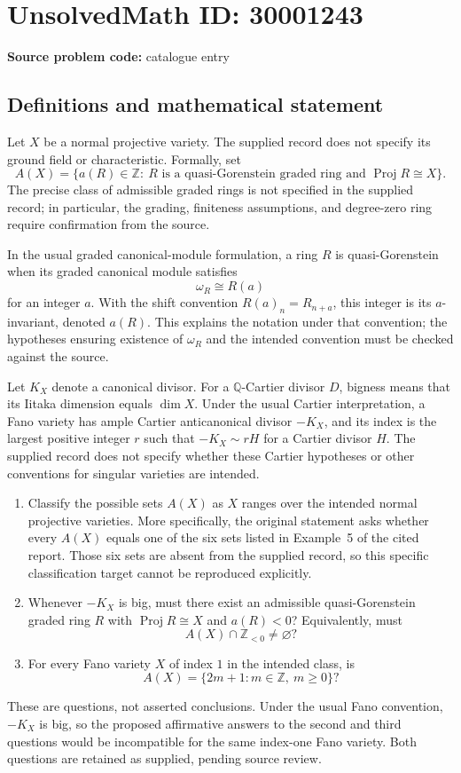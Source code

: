 \documentclass[11pt]{article}
\newcommand{\Z}{\mathbb{Z}}
\newcommand{\Q}{\mathbb{Q}}
\begin{document}
\section*{UnsolvedMath ID: 30001243}
\textbf{Source problem code:} catalogue entry
\subsection{Definitions and mathematical statement}
Let \(X\) be a normal projective variety. The supplied record does not specify its ground field or characteristic. Formally, set
\[
A(X)=\bigl\{a(R)\in\Z:\ R\text{ is a quasi-Gorenstein graded ring and }\operatorname{Proj}R\cong X\bigr\}.
\]
The precise class of admissible graded rings is not specified in the supplied record; in particular, the grading, finiteness assumptions, and degree-zero ring require confirmation from the source.

In the usual graded canonical-module formulation, a ring \(R\) is quasi-Gorenstein when its graded canonical module satisfies
\[
\omega_R\cong R(a)
\]
for an integer \(a\). With the shift convention \(R(a)_n=R_{n+a}\), this integer is its \(a\)-invariant, denoted \(a(R)\). This explains the notation under that convention; the hypotheses ensuring existence of \(\omega_R\) and the intended convention must be checked against the source.

Let \(K_X\) denote a canonical divisor. For a \(\Q\)-Cartier divisor \(D\), bigness means that its Iitaka dimension equals \(\dim X\). Under the usual Cartier interpretation, a Fano variety has ample Cartier anticanonical divisor \(-K_X\), and its index is the largest positive integer \(r\) such that \(-K_X\sim rH\) for a Cartier divisor \(H\). The supplied record does not specify whether these Cartier hypotheses or other conventions for singular varieties are intended.

\begin{enumerate}
\item Classify the possible sets \(A(X)\) as \(X\) ranges over the intended normal projective varieties. More specifically, the original statement asks whether every \(A(X)\) equals one of the six sets listed in Example~5 of the cited report. Those six sets are absent from the supplied record, so this specific classification target cannot be reproduced explicitly.
\item Whenever \(-K_X\) is big, must there exist an admissible quasi-Gorenstein graded ring \(R\) with \(\operatorname{Proj}R\cong X\) and \(a(R)<0\)? Equivalently, must
\[
A(X)\cap\Z_{<0}\ne\varnothing?
\]
\item For every Fano variety \(X\) of index \(1\) in the intended class, is
\[
A(X)=\{2m+1:m\in\Z,\ m\geq0\}?
\]
\end{enumerate}
These are questions, not asserted conclusions. Under the usual Fano convention, \(-K_X\) is big, so the proposed affirmative answers to the second and third questions would be incompatible for the same index-one Fano variety. Both questions are retained as supplied, pending source review.
\end{document}
